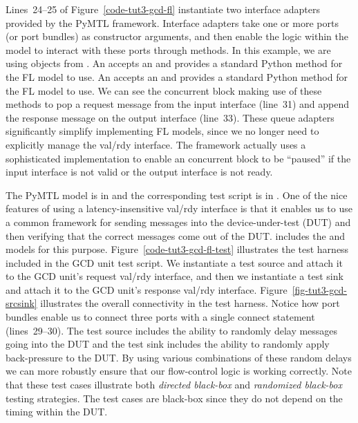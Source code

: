 \documentclass{cbxdoc}
\begin{document}
Lines~24--25 of Figure~\ref{code-tut3-gcd-fl} instantiate two interface
adapters provided by the PyMTL framework. Interface adapters take one or
more ports (or port bundles) as constructor arguments, and then enable
the logic within the model to interact with these ports through methods.
In this example, we are using  objects from
. An  accepts an
 and provides a standard Python  method
for the FL model to use. An  accepts an
 and provides a standard Python  method
for the FL model to use. We can see the  concurrent block
making use of these methods to pop a request message from the input
interface (line~31) and append the response message on the output
interface (line~33). These queue adapters significantly simplify
implementing FL models, since we no longer need to explicitly manage the
val/rdy interface. The framework actually uses a sophisticated
implementation to enable an  concurrent block to be ``paused''
if the input interface is not valid or the output interface is not ready.




The PyMTL model is in  and the corresponding test script
is in . One of the nice features of using a
latency-insensitive val/rdy interface is that it enables us to use a
common framework for sending messages into the device-under-test (DUT)
and then verifying that the correct messages come out of the DUT.
 includes the  and  models for
this purpose. Figure~\ref{code-tut3-gcd-fl-test} illustrates the test
harness included in the GCD unit test script. We instantiate a test
source and attach it to the GCD unit's request val/rdy interface, and
then we instantiate a test sink and attach it to the GCD unit's response
val/rdy interface. Figure~\ref{fig-tut3-gcd-srcsink} illustrates the
overall connectivity in the test harness. Notice how port bundles enable
us to connect three ports with a single connect statement (lines~29--30).
The test source includes the ability to randomly delay messages going
into the DUT and the test sink includes the ability to randomly apply
back-pressure to the DUT. By using various combinations of these random
delays we can more robustly ensure that our flow-control logic is working
correctly. Note that these test cases illustrate both \emph{directed
  black-box} and \emph{randomized black-box} testing strategies. The test
cases are black-box since they do not depend on the timing within the
DUT.
\end{document}

